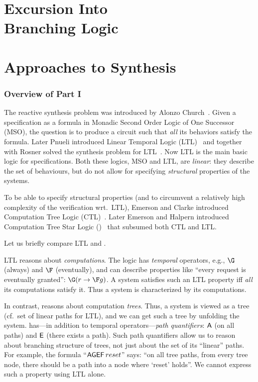 \part[Excursion into Branching Logic]{Excursion Into \\ Branching Logic \\ \ \\ \LARGE Approaches to \CTLstar Synthesis}

\section*{Overview of Part I}\label{chap:ctlstar:overview}

The reactive synthesis problem was introduced by Alonzo Church~\cite{Church63}.
Given a specification as a formula in Monadic Second Order Logic of One Successor (MSO),
the question is to produce a circuit such that \emph{all} its behaviors satisfy the formula.
Later Pnueli introduced Linear Temporal Logic (LTL)~\cite{pnueli1977temporal}
and together with Rosner solved the synthesis problem for LTL~\cite{DBLP:conf/popl/PnueliR89}.
Now LTL is the main basic logic for specifications.
Both these logics, MSO and LTL, are \emph{linear}:
they describe the set of behaviours,
but do not allow for specifying \emph{structural} properties of the systems.

To be able to specify structural properties
(and to circumvent a relatively high complexity of the verification wrt.\ LTL),
Emerson and Clarke introduced Computation Tree Logic (CTL)~\cite{ctl-origin}.
Later Emerson and Halpern introduced Computation Tree Star Logic (\CTLstar)~\cite{ctlstar-origin}
that subsumed both CTL and LTL.

Let us briefly compare LTL and \CTLstar.

LTL reasons about \emph{computations}.
The logic has \emph{temporal} operators, e.g., $\G$ (always) and $\F$ (eventually),
and can describe properties like ``every request is eventually granted'':
$\G(r \impl \F g)$.
A system satisfies such an LTL property iff \emph{all} its computations satisfy it.
Thus a system is characterized by its computations.

In contrast, \CTLstar reasons about computation \emph{trees}.
Thus, a system is viewed as a tree (cf.\ set of linear paths for LTL),
and we can get such a tree by unfolding the system.
\CTLstar has---in addition to temporal operators---\emph{path quantifiers}:
${\operatorname{\mathsf{A}}}$ (on all paths) and ${\operatorname{\mathsf{E}}}$ (there exists a path).
Such path quantifiers allow us to reason about branching structure of trees,
not just about the set of its ``linear'' paths.
For example, the \CTLstar formula ``$\operatorname{\mathsf{AGEF}} reset$'' says:
``on all tree paths, from every tree node,
  there should be a path into a node where `reset' holds''.
We cannot express such a property using LTL alone.

